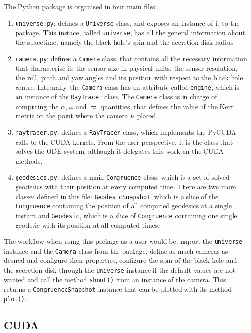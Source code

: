 The Python package is organised in four main files:
\begin{enumerate}
	\item \lstinline{universe.py}: defines a \lstinline{Universe} class, and exposes an instance of it to the package. This instace, called \lstinline{universe}, has all the general information about the spacetime, namely the black hole's spin and the accretion disk radius.
	\item \lstinline{camera.py}: defines a \lstinline{Camera} class, that contains all the necessary information that characterise it: the sensor size in physical units, the sensor resolution, the roll, pitch and yaw angles and its position with respect to the black hole centre. Internally, the \lstinline{Camera} class has an attribute called \lstinline{engine}, which is an instance of the \lstinline{RayTracer} class. The \lstinline{Camera} class is in charge of computing the $\alpha$, $\omega$ and $\varpi$ quantities, that defines the value of the Kerr metric on the point where the camera is placed.
	\item \lstinline{raytracer.py}: defines a \lstinline{RayTracer} class, which implements the PyCUDA calls to the \ac{CUDA} kernels. From the user perspective, it is the class that solves the \ac{ODE} system, although it delegates this work on the \ac{CUDA} methods.
	\item \lstinline{geodesics.py}: defines a main \lstinline{Congruence} class, which is a set of solved geodesics with their position at every computed time. There are two more classes defined in this file: \lstinline{GeodesicSnapshot}, which is a slice of the \lstinline{Congruence} containing the position of all computed geodesics at a single instant and \lstinline{Geodesic}, which is a slice of \lstinline{Congruence} containing one single geodesic with its position at all computed times.
\end{enumerate}

The workflow when using this package as a user would be: import the \lstinline{universe} instance and the \lstinline{Camera} class from the package, define as much cameras as desired and configure their properties, configure the spin of the black hole and the accretion disk through the \lstinline{universe} instance if the default values are not wanted and call the method \lstinline{shoot()} from an instance of the camera. This returns a \lstinline{CongruenceSnapshot} instance that can be plotted with its method \lstinline{plot()}.

\subsection{CUDA}

